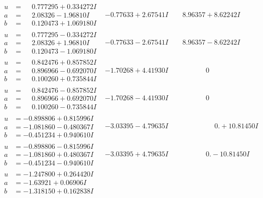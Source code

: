 \documentclass[1p]{elsarticle_modified}
\theoremstyle{definition}
\begin{document}
$$\begin{array}{c|c|c}
\begin{aligned}
u &= \phantom{-}0.777295 + 0.334272 I \\
a &= \phantom{-}2.08326 - 1.96810 I \\
b &= \phantom{-}0.120473 + 1.069180 I\end{aligned}
 & -0.77633 + 2.67541 I & \phantom{-}8.96357 + 8.62242 I \\ \hline\begin{aligned}
u &= \phantom{-}0.777295 - 0.334272 I \\
a &= \phantom{-}2.08326 + 1.96810 I \\
b &= \phantom{-}0.120473 - 1.069180 I\end{aligned}
 & -0.77633 - 2.67541 I & \phantom{-}8.96357 - 8.62242 I \\ \hline\begin{aligned}
u &= \phantom{-}0.842476 + 0.857852 I \\
a &= \phantom{-}0.896966 - 0.692070 I \\
b &= \phantom{-}0.100260 + 0.735844 I\end{aligned}
 & -1.70268 + 4.41930 I & \phantom{-0.000000 } 0 \\ \hline\begin{aligned}
u &= \phantom{-}0.842476 - 0.857852 I \\
a &= \phantom{-}0.896966 + 0.692070 I \\
b &= \phantom{-}0.100260 - 0.735844 I\end{aligned}
 & -1.70268 - 4.41930 I & \phantom{-0.000000 } 0 \\ \hline\begin{aligned}
u &= -0.898806 + 0.815996 I \\
a &= -1.081860 - 0.480367 I \\
b &= -0.451234 + 0.940610 I\end{aligned}
 & -3.03395 - 4.79635 I & \phantom{-0.000000 -}0. + 10.81450 I \\ \hline\begin{aligned}
u &= -0.898806 - 0.815996 I \\
a &= -1.081860 + 0.480367 I \\
b &= -0.451234 - 0.940610 I\end{aligned}
 & -3.03395 + 4.79635 I & \phantom{-0.000000 } 0. - 10.81450 I \\ \hline\begin{aligned}
u &= -1.247800 + 0.264420 I \\
a &= -1.63921 + 0.06906 I \\
b &= -1.318150 + 0.162838 I\end{aligned}

\end{array}$$
\end{document}
